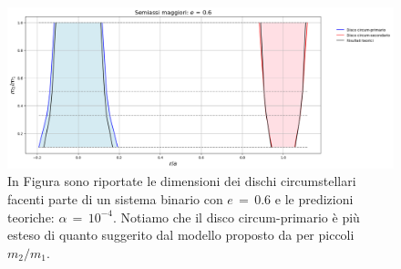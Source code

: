 \begin{figure}[H]
  \centering
  \includegraphics[width=\textwidth]{Immagini/Confronto/confax_A4_e6.png}
  \caption{In Figura sono riportate le dimensioni dei dischi circumstellari facenti parte di un sistema binario con $e\,=\,0.6$ e le predizioni teoriche: $\alpha\,=\,10^{-4}$. Notiamo che il disco circum-primario è più esteso di quanto suggerito dal modello proposto da \textcite{ManaraTronc2019} per piccoli $m_2/m_1$.}
  \label{fig:conf_ax46}
\end{figure}